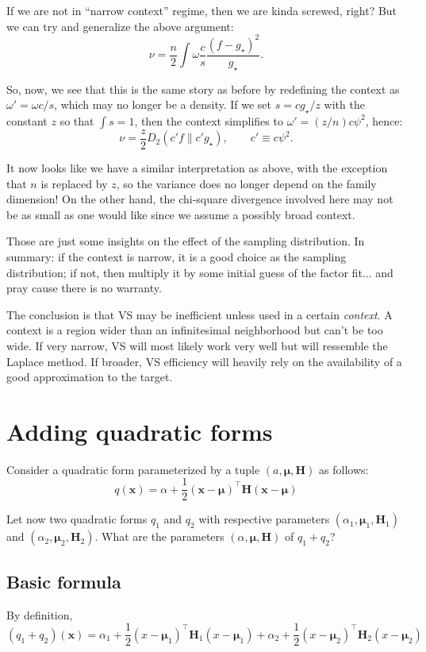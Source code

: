 \documentclass{article}
\def\x{{\mathbf{x}}}
\def\m{{\boldsymbol{\mu}}}
\def\H{\mathbf{H}}
\begin{document}
If we are not in ``narrow context'' regime, then we are kinda screwed, right? But we can try and generalize the above argument:
$$
\nu = \frac{n}{2}\int \omega \frac{c}{s} \frac{(f-g_\star)^2}{g_\star}
.
$$

So, now, we see that this is the same story as before by redefining the context as $\omega'=\omega c / s$, which may no longer be a density. If we set $s=c g_\star/z$ with the constant $z$ so that $\int s = 1$, then the context simplifies to $\omega'=(z/n) c \psi^2$, hence:
$$
\nu = \frac{z}{2} D_2(c' f\| c' g_\star),
\qquad
c' \equiv c\psi^2
.
$$

It now looks like we have a similar interpretation as above, with the exception that $n$ is replaced by $z$, so the variance does no longer depend on the family dimension! On the other hand, the chi-square divergence involved here may not be as small as one would like since we assume a possibly broad context. 

Those are just some insights on the effect of the sampling distribution. In summary: if the context is narrow, it is a good choice as the sampling distribution; if not, then multiply it by some initial guess of the factor fit... and pray cause there is no warranty.

The conclusion is that VS may be inefficient unless used in a certain {\em context}. A context is a region wider than an infinitesimal neighborhood but can't be too wide. If very narrow, VS will most likely work very well but will ressemble the Laplace method. If broader, VS efficiency will heavily rely on the availability of a good approximation to the target. 


\section{Adding quadratic forms}
\label{sec:quad_add}

Consider a quadratic form parameterized by a tuple $(a,\m,\H)$ as follows:
$$
q(\x) = \alpha + \frac{1}{2} (\x-\m)^\top \H (\x-\m)
$$

Let now two quadratic forms $q_1$ and $q_2$ with respective parameters $(\alpha_1,\m_1,\H_1)$ and $(\alpha_2,\m_2,\H_2)$. What are the parameters $(\alpha,\m,\H)$ of $q_1+q_2$? 

\subsection{Basic formula}

By definition,
$$
(q_1 + q_2)(\x)
= 
\alpha_1 + \frac{1}{2} (x-\m_1)^\top \H_1 (x-\m_1)
+ \alpha_2 + \frac{1}{2} (x-\m_2)^\top \H_2 (x-\m_2)
$$
\end{document}
